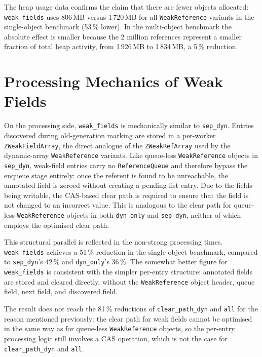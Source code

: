 The heap usage data confirms the claim that there are fewer objects allocated: \texttt{weak\_fields} uses 806\,MB versus 1\,720\,MB for all \texttt{WeakReference} variants in the single-object benchmark (53\,\% lower). In the multi-object benchmark the absolute effect is smaller because the 2 million references represent a smaller fraction of total heap activity, from 1\,926\,MB to 1\,834\,MB, a 5\,\% reduction.

\section{Processing Mechanics of Weak Fields}
\label{sec:disc-wf-residual}

On the processing side, \texttt{weak\_fields} is mechanically similar to \texttt{sep\_dyn}. Entries discovered during old-generation marking are stored in a per-worker \texttt{ZWeakFieldArray}, the direct analogue of the \texttt{ZWeakRefArray} used by the dynamic-array \texttt{WeakReference} variants. Like queue-less \texttt{WeakReference} objects in \texttt{sep\_dyn}, weak-field entries carry no \texttt{ReferenceQueue} and therefore bypass the enqueue stage entirely: once the referent is found to be unreachable, the annotated field is zeroed without creating a pending-list entry. Due to the fields being writable, the \ac{CAS}-based clear path is required to ensure that the field is not changed to an incorrect value. This is analogous to the clear path for queue-less \texttt{WeakReference} objects in both \texttt{dyn\_only} and \texttt{sep\_dyn}, neither of which employs the optimised clear path.

This structural parallel is reflected in the non-strong processing times. \texttt{weak\_fields} achieves a 51\,\% reduction in the single-object benchmark, compared to \texttt{sep\_dyn}'s 42\,\% and \texttt{dyn\_only}'s 36\,\%. The somewhat better figure for \texttt{weak\_fields} is consistent with the simpler per-entry structure: annotated fields are stored and cleared directly, without the \texttt{WeakReference} object header, queue field, next field, and discovered field.

The result does not reach the 81\,\% reductions of \texttt{clear\_path\_dyn} and \texttt{all} for the reason mentioned previously: the clear path for weak fields cannot be optimised in the same way as for queue-less \texttt{WeakReference} objects, so the per-entry processing logic still involves a \ac{CAS} operation, which is not the case for \texttt{clear\_path\_dyn} and \texttt{all}.

